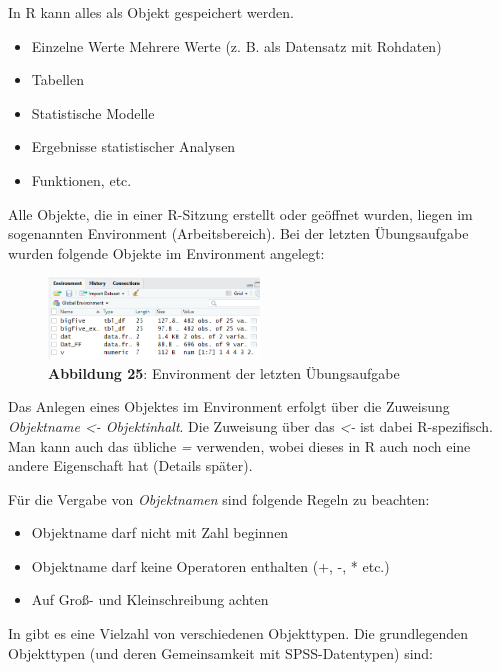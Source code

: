 \documentclass[]{article}
\providecommand{\tightlist}{%
  \setlength{\itemsep}{0pt}\setlength{\parskip}{0pt}}
\begin{document}
In R kann alles als Objekt gespeichert werden.

\begin{itemize}
\tightlist
\item
  Einzelne Werte Mehrere Werte (z. B. als Datensatz mit Rohdaten)
\item
  Tabellen
\item
  Statistische Modelle
\item
  Ergebnisse statistischer Analysen
\item
  Funktionen, etc.
\end{itemize}

Alle Objekte, die in einer R-Sitzung erstellt oder geöffnet wurden,
liegen im sogenannten Environment (Arbeitsbereich). Bei der letzten
Übungsaufgabe wurden folgende Objekte im Environment angelegt:

\begin{figure}
\centering
\includegraphics[width=0.50000\textwidth]{Images/06_Environment.PNG}
\caption{\textbf{Abbildung 25}: Environment der letzten Übungsaufgabe}
\end{figure}

Das Anlegen eines Objektes im Environment erfolgt über die Zuweisung
\emph{Objektname \textless{}- Objektinhalt}. Die Zuweisung über das
\emph{\textless{}-} ist dabei R-spezifisch. Man kann auch das übliche
\emph{=} verwenden, wobei dieses in R auch noch eine andere Eigenschaft
hat (Details später).

Für die Vergabe von \emph{Objektnamen} sind folgende Regeln zu beachten:

\begin{itemize}
\tightlist
\item
  Objektname darf nicht mit Zahl beginnen
\item
  Objektname darf keine Operatoren enthalten (+, -, * etc.)
\item
  Auf Groß- und Kleinschreibung achten
\end{itemize}

In gibt es eine Vielzahl von verschiedenen Objekttypen. Die
grundlegenden Objekttypen (und deren Gemeinsamkeit mit SPSS-Datentypen)
sind:
\end{document}
